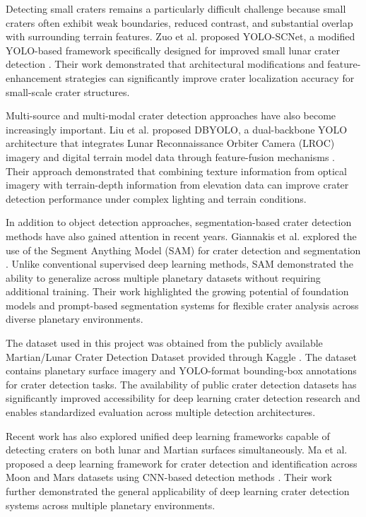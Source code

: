 \documentclass[conference]{IEEEtran}
\begin{document}
	Detecting small craters remains a particularly difficult challenge because small craters often exhibit weak boundaries, reduced contrast, and substantial overlap with surrounding terrain features. Zuo et al. proposed YOLO-SCNet, a modified YOLO-based framework specifically designed for improved small lunar crater detection \cite{b5}. Their work demonstrated that architectural modifications and feature-enhancement strategies can significantly improve crater localization accuracy for small-scale crater structures.
	
	Multi-source and multi-modal crater detection approaches have also become increasingly important. Liu et al. proposed DBYOLO, a dual-backbone YOLO architecture that integrates Lunar Reconnaissance Orbiter Camera (LROC) imagery and digital terrain model data through feature-fusion mechanisms \cite{b6}. Their approach demonstrated that combining texture information from optical imagery with terrain-depth information from elevation data can improve crater detection performance under complex lighting and terrain conditions.
	
	In addition to object detection approaches, segmentation-based crater detection methods have also gained attention in recent years. Giannakis et al. explored the use of the Segment Anything Model (SAM) for crater detection and segmentation \cite{b7}. Unlike conventional supervised deep learning methods, SAM demonstrated the ability to generalize across multiple planetary datasets without requiring additional training. Their work highlighted the growing potential of foundation models and prompt-based segmentation systems for flexible crater analysis across diverse planetary environments.
	
	The dataset used in this project was obtained from the publicly available Martian/Lunar Crater Detection Dataset provided through Kaggle \cite{b8}. The dataset contains planetary surface imagery and YOLO-format bounding-box annotations for crater detection tasks. The availability of public crater detection datasets has significantly improved accessibility for deep learning crater detection research and enables standardized evaluation across multiple detection architectures.
	
	Recent work has also explored unified deep learning frameworks capable of detecting craters on both lunar and Martian surfaces simultaneously. Ma et al. proposed a deep learning framework for crater detection and identification across Moon and Mars datasets using CNN-based detection methods \cite{b10}. Their work further demonstrated the general applicability of deep learning crater detection systems across multiple planetary environments.
	
\end{document}
